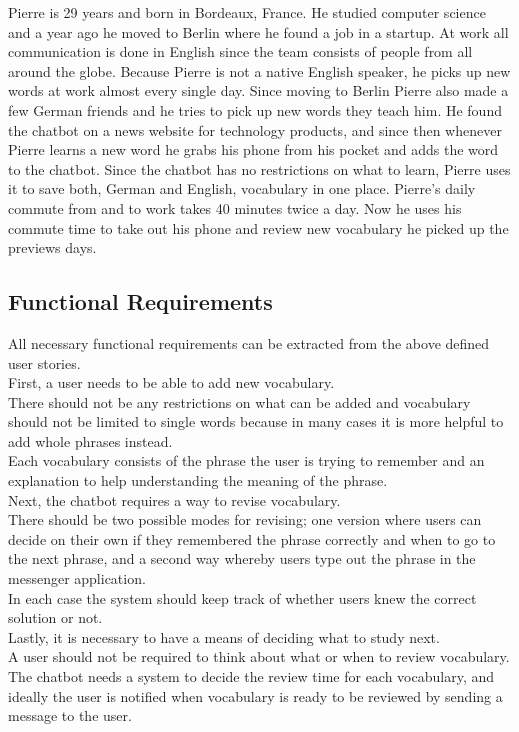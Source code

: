 Pierre is 29 years and born in Bordeaux, France.
He studied computer science and a year ago he moved to Berlin where he found a job in a startup.
At work all communication is done in English since the team consists of people from all around the globe.
Because Pierre is not a native English speaker, he picks up new words at work almost every single day.
Since moving to Berlin Pierre also made a few German friends and he tries to pick up new words they teach him.
He found the chatbot on a news website for technology products,
and since then whenever Pierre learns a new word he grabs his phone from his pocket and adds the word to the chatbot.
Since the chatbot has no restrictions on what to learn, Pierre uses it to save both, German and English, vocabulary in one place.
Pierre's daily commute from and to work takes 40 minutes twice a day.
Now he uses his commute time to take out his phone and review new vocabulary he picked up the previews days.
\\


\subsection{Functional Requirements}
\label{funcreq}

All necessary functional requirements can be extracted from the above defined user stories.
\\

First, a user needs to be able to add new vocabulary.
\\
There should not be any restrictions on what can be added
and vocabulary should not be limited to single words because in many cases it is more helpful
to add whole phrases instead.
\\
Each vocabulary consists of the phrase the user is trying to remember
and an explanation to help understanding the meaning of the phrase.
\\

Next, the chatbot requires a way to revise vocabulary.
\\
There should be two possible modes for revising;
one version where users can decide on their own if they remembered the phrase correctly
and when to go to the next phrase,
and a second way whereby users type out the phrase in the messenger application.
\\
In each case the system should keep track of whether users knew the correct solution or not.
\\

Lastly, it is necessary to have a means of deciding what to study next.
\\
A user should not be required to think about what or when to review vocabulary.
The chatbot needs a system to decide the review time for each vocabulary,
and ideally the user is notified when vocabulary is ready to be reviewed by sending a message to the user.
\\


